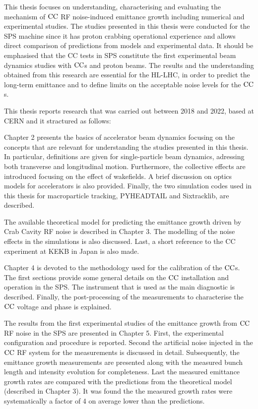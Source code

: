 This thesis focuses on understanding, characterising and evaluating the mechanism of ${\mathrm{CC}}$ RF noise-induced emittance growth including numerical and experimental studies. The studies presented in this thesis were conducted for the SPS machine since it has proton crabbing operational experience and allows direct comparison of predictions from models and experimental data. It should be emphasised that the CC tests in SPS constitute the first experimental beam dynamics studies with ${\mathrm{CC}}$s and proton beams. The results and the understanding obtained from this research are essential for the HL-LHC, in order to predict the long-term emittance and to define limits on the acceptable noise levels for the ${\mathrm{CC}}$s.

This thesis reports research that was carried out between 2018 and 2022, based at CERN and it stractured as follows:

Chapter 2 presents the basics of accelerator beam dynamics focusing on the concepts that are relevant for understanding the studies presented in this thesis. In particular, definitions are given for single-particle beam dynamics, adressing both transverse and longitudinal motion. Furthermore, the collective effects are introduced focusing on the effect of wakefields. A brief discussion on optics models for accelerators is also provided. Finally, the two simulation codes used in this thesis for macroparticle tracking, PYHEADTAIL and Sixtracklib, are described.

The available theoretical model for predicting the emittance growth driven by Crab Cavity RF noise is described in Chapter 3. The modelling of the noise effects in the simulations is also discussed. Last, a short reference to the CC experiment at KEKB in Japan is also made. 


Chapter 4 is devoted to the methodology used for the calibration of the ${\mathrm{CC}}$s. The first sections provide some general details on the ${\mathrm{CC}}$ installation and operation in the SPS. The instrument that is used as the main diagnostic is described. Finally, the post-processing of the measurements to characterise the ${\mathrm{CC}}$ voltage and phase is explained. %

The results from the first experimental studies of the emittance growth from ${\mathrm{CC}}$ RF noise in the SPS are presented in Chapter 5. First, the experimental configuration and procedure is reported. Second the artificial noise injected in the ${\mathrm{CC}}$ RF system for the measurements is discussed in detail. Subsequently, the emittance growth measurements are presented along with the measured bunch length and intensity evolution for completeness. Last the measured emittance growth rates are compared with the predictions from the theoretical model (described in Chapter 3). It was found the the measured growth rates were systematically a factor of 4 on average lower than the predictions. 

